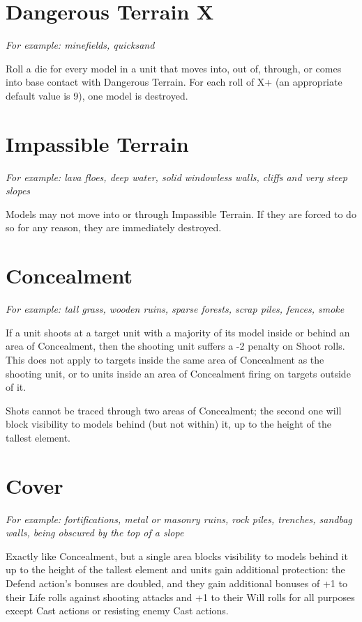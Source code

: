 \begin{multicols}{2}
\section*{Dangerous Terrain X}
\textit{For example: minefields, quicksand}

Roll a die for every model in a unit that moves into, out of, through, or comes into base contact with Dangerous Terrain. For each roll of X+ (an appropriate default value is 9), one model is destroyed.




\section*{Impassible Terrain}
\textit{For example: lava floes, deep water, solid windowless walls, cliffs and very steep slopes}

Models may not move into or through Impassible Terrain. If they are forced to do so for any reason, they are immediately destroyed.




\section*{Concealment}
\textit{For example: tall grass, wooden ruins, sparse forests, scrap piles, fences, smoke}

If a unit shoots at a target unit with a majority of its model inside or behind an area of Concealment, then the shooting unit suffers a -2 penalty on Shoot rolls. This does not apply to targets inside the same area of Concealment as the shooting unit, or to units inside an area of Concealment firing on targets outside of it.

Shots cannot be traced through two areas of Concealment; the second one will block visibility to models behind (but not within) it, up to the height of the tallest element.




\section*{Cover}
\textit{For example: fortifications, metal or masonry ruins, rock piles, trenches, sandbag walls, being obscured by the top of a slope}

Exactly like Concealment, but a single area blocks visibility to models behind it up to the height of the tallest element and units gain additional protection: the Defend action's bonuses are doubled, and they gain additional bonuses of +1 to their Life rolls against shooting attacks and +1 to their Will rolls for all purposes except Cast actions or resisting enemy Cast actions.



\end{multicols}

